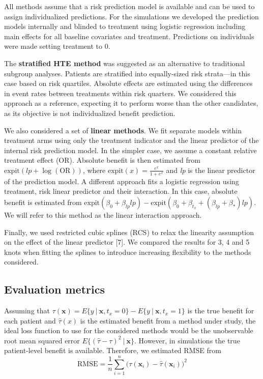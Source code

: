 \documentclass{article}
\begin{document}
All methods assume that a risk prediction model is available and can be
used to assign individualized predictions. For the simulations we
developed the prediction models internally and blinded to treatment
using logistic regression including main effects for all baseline
covariates and treatment. Predictions on individuals were made setting
treatment to \(0\).

The \textbf{stratified HTE method} was suggested as an alternative to
traditional subgroup analyses. Patients are stratified into
equally-sized risk strata---in this case based on risk quartiles.
Absolute effects are estimated using the differences in event rates
between treatments within risk quarters. We considered this approach as
a reference, expecting it to perform worse than the other candidates, as
its objective is not individualized benefit prediction.

We also considered a set of \textbf{linear methods}. We fit separate
models within treatment arms using only the treatment indicator and the
linear predictor of the internal risk prediction model. In the simpler
case, we assume a constant relative treatment effect (OR). Absolute
benefit is then estimated from \(\text{expit}(lp +\log(\text{OR}))\),
where \(\text{expit}(x)=\frac{e^x}{1+e^x}\) and \emph{lp} is the linear
predictor of the prediction model. A different approach fits a logistic
regression using treatment, risk linear predictor and their interaction.
In this case, absolute benefit is estimated from
\(\text{expit}(\beta_0+\beta_{lp}lp) - \text{expit}(\beta_0+\beta_{t_x}+(\beta_{lp}+\beta_*)lp)\).
We will refer to this method as the linear interaction approach.

Finally, we used restricted cubic splines (RCS) to relax the linearity
assumption on the effect of the linear predictor {[}7{]}. We compared
the results for 3, 4 and 5 knots when fitting the splines to introduce
increasing flexibility to the methods considered.

\hypertarget{evaluation-metrics}{%
\subsection{Evaluation metrics}\label{evaluation-metrics}}

Assuming that
\(\tau(\bm{x})=E\{y\:\vert\:\bm{x}, t_x=0\} - E\{y\:\vert\:\bm{x},t_x=1\}\)
is the true benefit for each patient and \(\hat{\tau}(x)\) is the
estimated benefit from a method under study, the ideal loss function to
use for the considered methods would be the unobservable root mean
squared error \(E\big\{(\hat{\tau} - \tau)^2\:\vert\:\bm{x}\big\}\).
However, in simulations the true patient-level benefit is available.
Therefore, we estimated RMSE from
\[\text{RMSE}=\frac{1}{n}\sum_{i=1}^n\big(\tau(\bm{x}_i) - \hat{\tau}(\bm{x}_i)\big)^2\]
\end{document}
